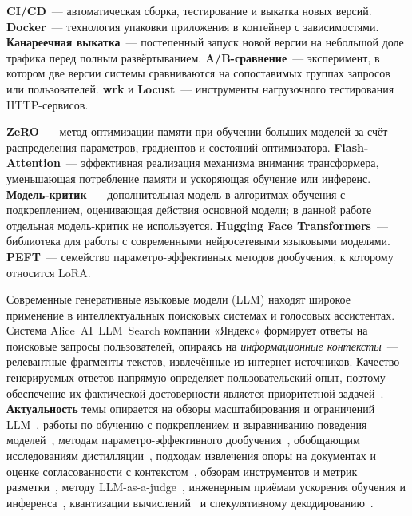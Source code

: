 \documentclass[times]{itmo-student-thesis}
\begin{document}
\medskip\noindent\textbf{CI/CD}~--- автоматическая сборка, тестирование и выкатка новых версий. \textbf{Docker}~---
технология упаковки приложения в контейнер с зависимостями.
\textbf{Канареечная выкатка}~--- постепенный запуск новой версии на небольшой
доле трафика перед полным развёртыванием.
\textbf{A/B-сравнение}~--- эксперимент, в котором две версии системы сравниваются
на сопоставимых группах запросов или пользователей.
\textbf{wrk} и \textbf{Locust}~--- инструменты нагрузочного тестирования
HTTP-сервисов.

\medskip\noindent\textbf{ZeRO}~--- метод оптимизации памяти при обучении
больших моделей за счёт распределения параметров, градиентов и состояний
оптимизатора. \textbf{Flash-Attention}~--- эффективная реализация механизма
внимания трансформера, уменьшающая потребление памяти и ускоряющая обучение
или инференс.
\textbf{Модель-критик}~--- дополнительная модель в алгоритмах обучения
с подкреплением, оценивающая действия основной модели; в данной работе
отдельная модель-критик не используется.
\textbf{Hugging Face Transformers}~--- библиотека для работы с современными
нейросетевыми языковыми моделями. \textbf{PEFT}~--- семейство параметро-эффективных
методов дообучения, к которому относится LoRA.

\clearpage

\startprefacepage

Современные генеративные языковые модели (LLM) находят широкое применение
в интеллектуальных поисковых системах и голосовых ассистентах. Система
Alice~AI~LLM~Search компании «Яндекс» формирует ответы на поисковые запросы
пользователей, опираясь на \emph{информационные контексты}~--- релевантные
фрагменты текстов, извлечённые из интернет-источников. Качество генерируемых
ответов напрямую определяет пользовательский опыт, поэтому обеспечение их
фактической достоверности является приоритетной задачей~\cite{guo2025deepseek}.
\textbf{Актуальность} темы опирается на обзоры масштабирования и ограничений
LLM~\cite{minaee2024llm-survey,wei2022emergent,touvron2023llama2}, работы по обучению с подкреплением
и выравниванию поведения моделей~\cite{ouyang2022instructgpt,schulman2017ppo,rafailov2023dpo},
методам параметро-эффективного дообучения~\cite{hu2022lora,sanh2019distilbert},
обобщающим исследованиям дистилляции~\cite{hinton2015distilling,distiller-nlp,towards-distillation-theory},
подходам извлечения опоры на документах и оценке согласованности с контекстом~\cite{lewis2020rag,es2023ragas,zhao2023survey},
обзорам инструментов и метрик разметки~\cite{silicon-annotation,automated-annotation-validation,llm-eval-survey},
методу LLM-as-a-judge~\cite{zheng2023judging}, инженерным приёмам ускорения обучения
и инференса~\cite{dao2022flashattention,dao2023flashattention2,rajbhandari2020zero,kwon2023vllm}, квантизации вычислений~\cite{nvidia2022fp8}
и спекулятивному декодированию~\cite{li2024eagle}.
\end{document}
